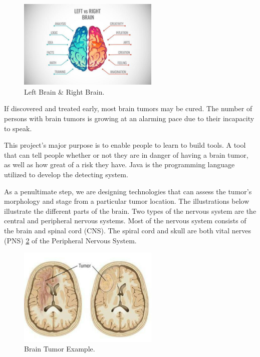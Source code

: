 \begin{figure}
    \centering
    \includegraphics[width=0.60\textwidth]{Img/Chap-01/4.jpg}
    \caption{Left Brain \& Right Brain.}
    \label{fig:left_and_right_brain}
\end{figure}

If discovered and treated early, most brain tumors may be cured.
The number of persons with brain tumors is growing at an alarming pace due to
their incapacity to speak.

This project's major purpose is to enable people to learn to build tools. A tool that
can tell people whether or not they are in danger of having a brain tumor, as
well as how great of a risk they have. Java is the programming language utilized to develop the detecting system.
    
As a penultimate step, we are designing technologies that can assess the tumor's
morphology and stage from a particular tumor location.
The illustrations below illustrate the different parts of the brain. Two types of the
nervous system are the central and peripheral nervous systems.
Most of the nervous system consists of the brain and spinal cord (CNS). The spiral
cord and skull are both vital nerves (PNS) \ref{fig:brain_tumor_example} of the Peripheral Nervous System.

\begin{figure}
    \centering
    \includegraphics[width=0.60\textwidth]{Img/Chap-01/5.jpg}
    \caption{Brain Tumor Example.}
    \label{fig:brain_tumor_example}
\end{figure}

